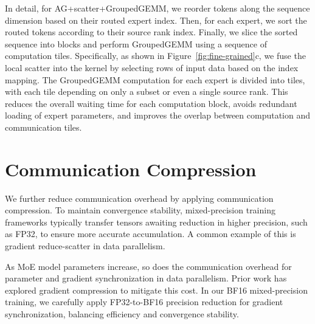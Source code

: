 In detail, for AG+scatter+GroupedGEMM, we reorder tokens along the sequence dimension based on their routed expert index. Then, for each expert, we sort the routed tokens according to their source rank index. Finally, we slice the sorted sequence into blocks and perform GroupedGEMM using a sequence of computation tiles. Specifically, as shown in Figure~\ref{fig:fine-grained}c, we fuse the local scatter into the kernel by selecting rows of input data based on the index mapping. The GroupedGEMM computation for each expert is divided into tiles, with each tile depending on only a subset or even a single source rank. 
This reduces the overall waiting time for each computation block, avoids redundant loading of expert parameters, and improves the overlap between computation and communication tiles.


\section{Communication Compression}
\label{sec:design:precision}

We further reduce communication overhead by applying communication compression. To maintain convergence stability, mixed-precision training frameworks typically transfer tensors awaiting reduction in higher precision, such as FP32, to ensure more accurate accumulation. A common example of this is gradient reduce-scatter in data parallelism.

 As MoE model parameters increase, so does the communication overhead for parameter and gradient synchronization in data parallelism. Prior work has explored gradient compression to mitigate this cost. In our BF16 mixed-precision training, we carefully apply FP32-to-BF16 precision reduction for gradient synchronization, balancing efficiency and convergence stability.

